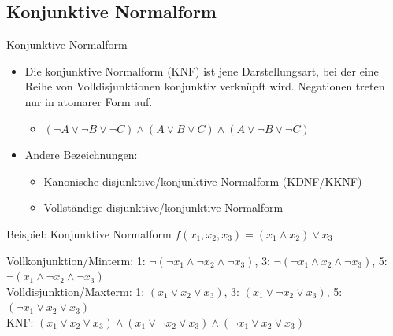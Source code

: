 \documentclass[12pt%
,aspectratio=169%
]{beamer}
\begin{document}
\subsection{Konjunktive Normalform}
\begin{frame}{Konjunktive Normalform}
\begin{itemize}
	\item Die konjunktive Normalform (KNF) ist jene Darstellungsart, bei der eine Reihe von Volldisjunktionen konjunktiv verknüpft wird. Negationen treten nur in atomarer Form auf.
	\begin{itemize}
		\item $(\neg A \lor \neg B \lor \neg C) \land (A \lor B \lor C) \land (A \lor \neg B \lor \neg C)$ 
	\end{itemize}
	\item Andere Bezeichnungen:
	\begin{itemize}
		\item Kanonische disjunktive/konjunktive Normalform (KDNF/KKNF)
		\item Vollständige disjunktive/konjunktive Normalform
	\end{itemize}
\end{itemize}
\end{frame}

\begin{frame}{Beispiel: Konjunktive Normalform}
\vspace*{-0.325cm}
$f(x_1, x_2, x_3) = (x_1 \land x_2) \lor x_3$
\begin{table}[]
\end{table}
Vollkonjunktion/Minterm: 1: $\neg(\neg x_1 \land \neg x_2 \land \neg x_3)$, 3: $\neg(\neg x_1 \land x_2 \land \neg x_3)$, 5: $\neg(x_1 \land \neg x_2 \land \neg x_3)$\\
Volldisjunktion/Maxterm: 1: $(x_1 \lor x_2 \lor x_3)$, 3: $(x_1 \lor \neg x_2 \lor x_3)$, 5: $(\neg x_1 \lor x_2 \lor x_3)$\\
KNF: $(x_1 \lor x_2 \lor x_3) \land (x_1 \lor \neg x_2 \lor x_3) \land (\neg x_1 \lor x_2 \lor x_3)$
\end{frame}
\end{document}
